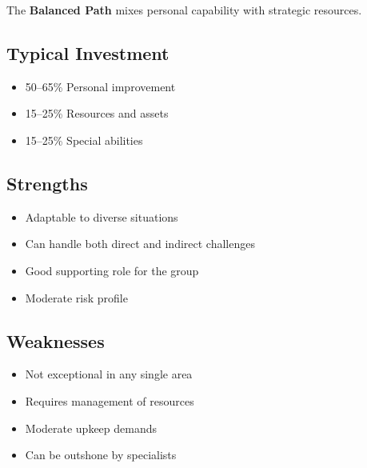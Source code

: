 The \textbf{Balanced Path} mixes personal capability with strategic resources.

\subsection*{Typical Investment}
\begin{itemize}
\item 50--65\% Personal improvement
\item 15--25\% Resources and assets
\item 15--25\% Special abilities
\end{itemize}

\subsection*{Strengths}
\begin{itemize}
\item Adaptable to diverse situations
\item Can handle both direct and indirect challenges
\item Good supporting role for the group
\item Moderate risk profile
\end{itemize}

\subsection*{Weaknesses}
\begin{itemize}
\item Not exceptional in any single area
\item Requires management of resources
\item Moderate upkeep demands
\item Can be outshone by specialists
\end{itemize}

